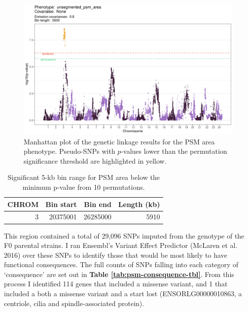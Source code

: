 \documentclass[
]{book}
\begin{document}
\begin{figure}
\includegraphics[width=1\linewidth]{figs/somites/manhattan_psm_no-covariates} \caption{Manhattan plot of the genetic linkage results for the PSM area phenotype. Pseudo-SNPs with \(p\)-values lower than the permutation significance threshold are highlighted in yellow.}\label{fig:psm-manhattan}
\end{figure}

\begin{table}

\caption{\label{tab:somite-sig-psm-tbl}Significant 5-kb bin range for PSM area below the minimum p-value from 10 permutations.}
\centering
\begin{tabular}[t]{r|r|r|r}
\hline
CHROM & Bin start & Bin end & Length (kb)\\
\hline
3 & 20375001 & 26285000 & 5910\\
\hline
\end{tabular}
\end{table}

This region contained a total of 29,096 SNPs imputed from the genotype of the F0 parental strains.
I ran Ensembl's Variant Effect Predictor (McLaren et al. 2016) over these SNPs to identify those that would be most likely to have functional consequences. The full counts of SNPs falling into each category of `consequence' are set out in \textbf{Table \ref{tab:psm-consequence-tbl}}. From this process I identified 114 genes that included a missense variant, and 1 that included a both a missense variant and a start lost (ENSORLG00000010863, a centriole, cilia and spindle-associated protein).
\end{document}
